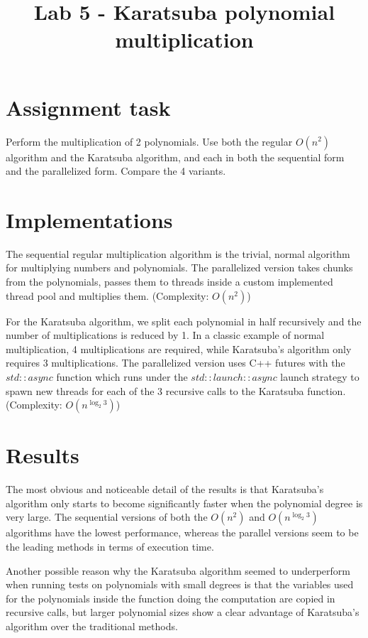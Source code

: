 \documentclass[journal, onecolumn, 12pt]{IEEEtran}
\begin{document}
\title{Lab 5 - Karatsuba polynomial multiplication\\
}

\author{
}

\maketitle

\section{Assignment task}
Perform the multiplication of 2 polynomials. Use both the regular $ O(n^2) $ algorithm and the Karatsuba algorithm, and each in both the sequential form and the parallelized form. Compare the 4 variants.

\section{Implementations}
The sequential regular multiplication algorithm is the trivial, normal algorithm for multiplying numbers and polynomials. The parallelized version takes chunks from the polynomials, passes them to threads inside a custom implemented thread pool and multiplies them. (Complexity: $ O(n^2) $)

For the Karatsuba algorithm, we split each polynomial in half recursively and the number of multiplications is reduced by 1. In a classic example of normal multiplication, 4 multiplications are required, while Karatsuba's algorithm only requires 3 multiplications. The parallelized version uses C++ futures with the $ std::async $ function which runs under the $ std::launch::async $ launch strategy to spawn new threads for each of the 3 recursive calls to the Karatsuba function. 
(Complexity: $ O(n^{\log_2 3}) $)

\section{Results}

The most obvious and noticeable detail of the results is that Karatsuba's algorithm only starts to become significantly faster when the polynomial degree is very large. The sequential versions of both the $ O(n^2) $ and $ O(n^{\log_2 3}) $ algorithms have the lowest performance, whereas the parallel versions seem to be the leading methods in terms of execution time. 

Another possible reason why the Karatsuba algorithm seemed to underperform when running tests on polynomials with small degrees is that the variables used for the polynomials inside the function doing the computation are copied in recursive calls, but larger polynomial sizes show a clear advantage of Karatsuba's algorithm over the traditional methods.
\end{document}

